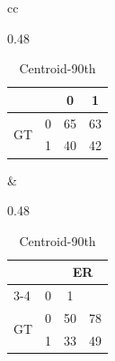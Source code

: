 \begin{table}[!b]
\begin{tabular}{cc}
\begin{subtable}{0.48\columnwidth}
\begin{tabular}{|lc|cc|}
        \multicolumn{2}{|l|}{} & \multicolumn{1}{c|}{0} & \multicolumn{1}{c|}{1} \\ \hline
        \multicolumn{1}{|c|}{\multirow{2}{*}{GT}} & 0 & \multicolumn{1}{c|}{65} & 63 \\ \cline{2-4}
        \multicolumn{1}{|c|}{} & 1 & \multicolumn{1}{c|}{40} & 42 \\ \hline
      \end{tabular}
      \vspace{5pt}
    \end{subtable}
    &
    \begin{subtable}{0.48\columnwidth}
      \centering
      \caption{Centroid-90th}
      \label{matrix_rf_train_d}
      \scriptsize
      \begin{tabular}{|lc|cc|}
        \hline
        \multicolumn{2}{|l|}{\multirow{2}{*}{}} & \multicolumn{2}{c|}{ER} \\ \cline{3-4}
        \multicolumn{2}{|l|}{} & \multicolumn{1}{c|}{0} & \multicolumn{1}{c|}{1} \\ \hline
        \multicolumn{1}{|c|}{\multirow{2}{*}{GT}} & 0 & \multicolumn{1}{c|}{50} & 78 \\ \cline{2-4}
        \multicolumn{1}{|c|}{} & 1 & \multicolumn{1}{c|}{33} & 49 \\ \hline
      \end{tabular}
      \vspace{5pt}
    \end{subtable}
    \\
  \end{tabular}
\end{table}

